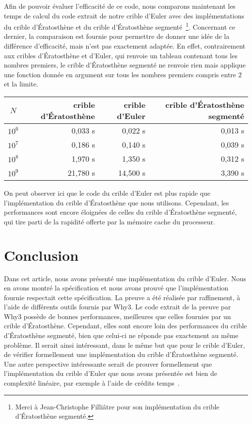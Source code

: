 \documentclass[a4paper]{easychair}
\begin{document}
Afin de pouvoir évaluer l'efficacité de ce code, nous comparons maintenant
les temps de calcul du code extrait de notre crible d'Euler avec des
implémentations du crible d'Ératosthène et du crible d'Ératosthène
segmenté~\footnote{Merci à
  Jean-Christophe Filliâtre pour son implémentation du crible d'Ératosthène
  segmenté.}.
Concernant ce dernier, la comparaison est fournie pour permettre de donner
une idée de la différence d'efficacité, mais n'est pas exactement adaptée.
En effet, contrairement aux cribles d'Ératosthène et d'Euler, qui renvoie
un tableau contenant tous les nombres premiers, le crible d'Ératosthène
segmenté ne renvoie rien mais applique une fonction 
donnée en argument sur tous les nombres premiers compris entre $2$ et
la limite.
\begin{center}
  \begin{tabular}{|c|r|r|r|}
    \hline
    $N$ & crible d'Ératosthène & crible d'Euler &
    \multicolumn{1}{|p{3.1cm}|}{crible d'Ératosthène segmenté}\\
    \hline\hline
    $10^6$ &  0,033 s &  0,022 s &  0,013 s \\\hline
    $10^7$ &  0,186 s &  0,140 s &  0,039 s \\\hline
    $10^8$ &  1,970 s &  1,350 s &  0,312 s \\\hline
    $10^9$ & 21,780 s & 14,500 s &  3,390 s \\\hline
  \end{tabular}
\end{center}
On peut observer ici que le code du crible d'Euler est plus rapide
que l'implémentation du crible d'Ératosthène que nous utilisons.
Cependant, les performances sont encore éloignées de celles du crible
d'Ératosthène segmenté, qui tire parti de la rapidité offerte
par la mémoire cache du processeur.

\section{Conclusion}
\label{sec:conclusion}

Dans cet article, nous avons présenté une implémentation du crible d'Euler.
Nous en avons montré la spécification et nous avons prouvé que
l'implémentation fournie respectait cette spécification.
La preuve a été réalisée par raffinement, à l'aide de différents outils
fournis par Why3.
Le code extrait de la preuve par Why3 possède de bonnes performances,
meilleures que celles fournies par un crible d'Ératosthène.
Cependant, elles sont encore loin des performances du crible d'Ératosthène
segmenté, bien que celui-ci ne réponde pas exactement au même problème.
Il serait ainsi intéressant, dans le même but que pour le crible d'Euler,
de vérifier formellement une implémentation du crible d'Ératosthène
segmenté.
Une autre perspective intéressante serait de prouver formellement
que l'implémentation du crible
d'Euler que nous avons présentée est bien de complexité linéaire, par
exemple
à l'aide de crédits temps~\cite{chargueraud-pottier-uf-sltc-19}.
\end{document}
